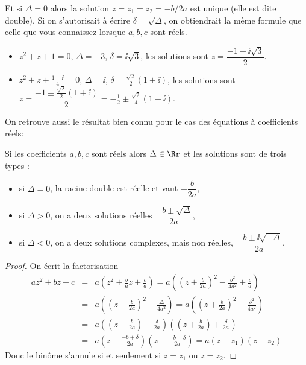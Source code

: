 \documentclass[class=report,crop=false]{standalone}
\begin{document}
Et si $\Delta = 0$ alors la solution $z = z_1 = z_2 = - b / 2 a$ est unique (elle est dite double).
Si on s'autorisait à écrire $\delta = \sqrt{\Delta}$, on obtiendrait
la même formule que celle que vous connaissez lorsque $a,b,c$ sont réels.

\begin{exemple}
\sauteligne
  \begin{itemize}
    \item $z^2 + z + 1 = 0$, $\Delta = - 3$, $\delta = \ii  \sqrt{3}$,
    les solutions sont $z = \dfrac{- 1 \pm \ii  \sqrt{3}}{2}$.

    \item $z^2 + z + \frac{1 - \ii }{4}=0$, $\Delta = \ii $, $\delta = \frac{\sqrt2}{2}(1 +
    \ii)$, les solutions sont $z = \dfrac{- 1 \pm \frac{\sqrt2}{2}(1 +
    \ii)}{2} = -\frac12 \pm \frac{\sqrt2}{4}(1 +
    \ii)$.
  \end{itemize}
\end{exemple}

On retrouve aussi le résultat bien connu pour le cas des équations à coefficients réels:
\begin{corollaire}
  Si les coefficients $a, b, c$ sont réels alors $\Delta \in \Rr$ et les solutions sont de
  trois types :
  \begin{itemize}
    \item si $\Delta = 0$, la racine double est réelle et vaut $-\dfrac{b}{2 a}$,

    \item si $\Delta > 0$, on a deux solutions réelles $\dfrac{- b \pm\sqrt{\Delta}}{2 a}$,

    \item si $\Delta < 0$, on a deux solutions complexes, mais non réelles, $\dfrac{- b \pm \ii  \sqrt{- \Delta}}{2 a}$.
  \end{itemize}
\end{corollaire}

\begin{proof}
  On écrit la factorisation
  \begin{eqnarray*}
    az^2 + bz + c & = & a \left( z^2 + \frac{b}{a} z + \frac{c}{a} \right) = a
    \left( \left( z + \frac{b}{2 a} \right)^2 - \frac{b^2}{4 a^2} +
    \frac{c}{a} \right) \\
    & = & a \left( \left( z + \frac{b}{2 a} \right)^2 -
    \frac{\Delta}{4 a^2} \right)
    = a \left( \left( z + \frac{b}{2 a} \right)^2 - \frac{\delta^2}{4
    a^2} \right) \\
    & = & a \left( \left( z + \frac{b}{2 a} \right) - \frac{\delta}{2
    a^{}} \right)  \left( \left( z + \frac{b}{2 a} \right) + \frac{\delta}{2
    a^{}} \right)\\
    & = & a \left( z - \frac{- b + \delta}{2 a} \right)  \left( z - \frac{- b
    - \delta}{2 a} \right) = a \left( z - z_1 \right)  \left( z - z_2 \right)
  \end{eqnarray*}
Donc le binôme s'annule si et seulement si $z=z_1$ ou $z=z_2$.
\end{proof}
\end{document}
